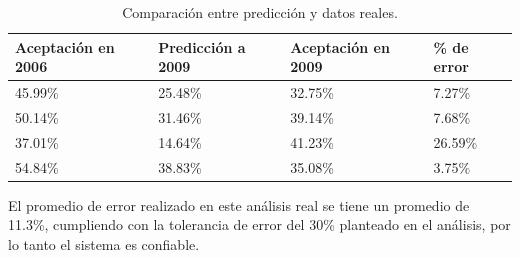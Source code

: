 \begin{table}[H]
\centering
\begin{tabular}{|l|l|l|l|}
\hline
\rowcolor[HTML]{3166FF} 
{\color[HTML]{FFFFFF} Aceptación en 2006} & {\color[HTML]{FFFFFF} Predicción a 2009} & {\color[HTML]{FFFFFF} Aceptación en 2009} & {\color[HTML]{FFFFFF} \% de error} \\ \hline
45.99\% & 25.48\% & 32.75\% & 7.27\% \\ \hline
50.14\% & 31.46\% & 39.14\% & 7.68\% \\ \hline
37.01\% & 14.64\% & 41.23\% & 26.59\% \\ \hline
54.84\% & 38.83\% & 35.08\% & 3.75\% \\ \hline
\end{tabular}
\caption{Comparación entre predicción y datos reales. }
\label{table:resultadosprediccion}
\end{table}

El promedio de error realizado en este análisis real se tiene un promedio de 11.3\%, cumpliendo con la tolerancia de error del 30\% planteado en el análisis, por lo tanto el sistema es confiable.